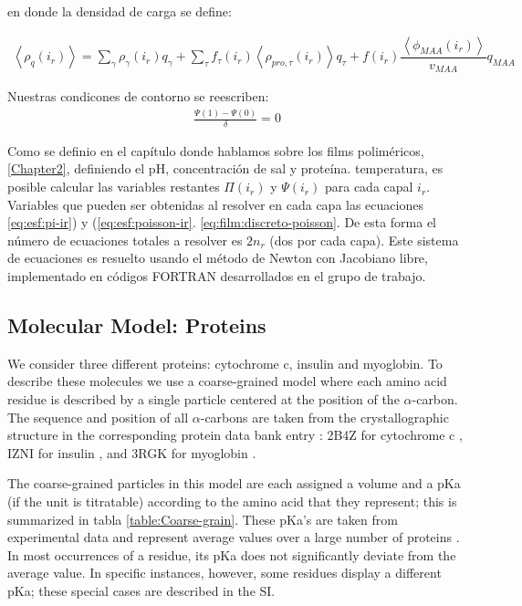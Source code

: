 \noindent en donde la densidad de carga se define:

\begin{align}
	\left<\rho_q(i_r)\right> = \sum_{\gamma } {\rho_\gamma(i_r) q_\gamma + \sum_\tau{f_\tau(i_r) \left<\rho_{pro,\tau}(i_r)\right> q_\tau} +  f(i_r)\dfrac{\left<\phi_{MAA}(i_r)\right>}{v_{MAA}}q_{MAA}}
\end{align}

Nuestras condicones de contorno se reescriben:
\begin{align}
	\frac{\Psi(1) - \Psi(0)}{\delta} = 0
\end{align}

Como se definio en el cap\'itulo donde hablamos sobre los films polim\'ericos,\ref{Chapter2}, definiendo  el pH, concentraci\'on de sal y prote\'ina. temperatura, es posible calcular las variables restantes  $\Pi(i_r)$ y $\Psi(i_r)$ para cada capal $i_r$.
Variables que pueden ser obtenidas al resolver en cada capa las ecuaciones \ref{eq:esf:pi-ir}) y (\ref{eq:esf:poisson-ir}. \ref{eq:film:discreto-poisson}.
De esta forma el n\'umero de ecuaciones totales a resolver es $2n_r$ (dos por cada capa). 
Este sistema de ecuaciones es resuelto usando el m\'etodo de Newton con Jacobiano libre, implementado en c\'odigos FORTRAN desarrollados en el grupo de trabajo.



\subsection{Molecular Model: Proteins}\label{sect:protein}


We consider three different proteins:  cytochrome c, insulin and myoglobin.
To describe these molecules we use a coarse-grained model where each amino acid residue is described by a single particle centered at the position of the $\alpha$-carbon.
The sequence and position of all $\alpha$-carbons are taken from the crystallographic structure in the corresponding protein data bank entry : 2B4Z for cytochrome c , IZNI for insulin , and 3RGK for myoglobin \addcite[hubbard1990x]. 
 
 

The coarse-grained particles in this model are each assigned a volume and a pKa (if the unit is titratable) according to the amino acid that they represent; 
this is summarized in  tabla \ref{table:Coarse-grain}.
These pKa's are taken from experimental data and represent average values over a large number of proteins .
In most occurrences of a residue, its pKa does not significantly deviate from the average value.
In  specific instances, however, some residues display a different pKa;
these special cases are described in the SI.


